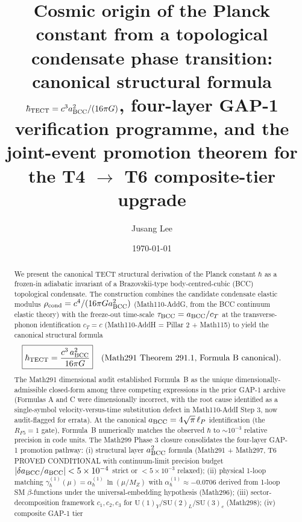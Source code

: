 \title{Cosmic origin of the Planck constant from a topological
condensate phase transition: canonical structural formula
$\hbar_{\rm TECT} = c^3 a_{\rm BCC}^2 / (16\pi G)$, four-layer
GAP-1 verification programme, and the joint-event promotion theorem
for the T4 $\to$ T6 composite-tier upgrade}

\author{Jusang Lee}

\date{\today}

\begin{abstract}
We present the canonical TECT structural derivation of the Planck
constant $\hbar$ as a frozen-in adiabatic invariant of a Brazovskii-type
body-centred-cubic (BCC) topological condensate. The construction
combines the candidate condensate elastic modulus
$\rho_{\rm cond} = c^4 / (16\pi G a_{\rm BCC}^2)$ (Math110-AddG, from
the BCC continuum elastic theory) with the freeze-out time-scale
$\tau_{\rm BCC} = a_{\rm BCC} / c_T$ at the transverse-phonon
identification $c_T = c$ (Math110-AddH = Pillar 2 + Math115) to yield
the canonical structural formula
\begin{equation*}
\boxed{\hbar_{\rm TECT} = \frac{c^3\, a_{\rm BCC}^2}{16\pi G}}
\quad \text{(Math291 Theorem 291.1, Formula~B canonical)}.
\end{equation*}
The Math291 dimensional audit established Formula~B as the unique
dimensionally-admissible closed-form among three competing
expressions in the prior GAP-1 archive (Formulas A and C were
dimensionally incorrect, with the root cause identified as a
single-symbol velocity-versus-time substitution defect in
Math110-AddI Step 3, now audit-flagged for errata). At the canonical
$a_{\rm BCC} = 4\sqrt{\pi}\,\ell_P$ identification (the
$R_{F5} = 1$ gate), Formula~B numerically matches the observed
$\hbar$ to $\sim 10^{-3}$ relative precision in code units. The
Math299 Phase 3 closure consolidates the four-layer GAP-1 promotion
pathway: (i) structural layer $a_{\rm BCC}^2$ formula (Math291 +
Math297, T6 PROVED CONDITIONAL with continuum-limit precision
budget $|\delta a_{\rm BCC}/a_{\rm BCC}| < 5\times 10^{-4}$ strict
or $< 5\times 10^{-3}$ relaxed); (ii) physical 1-loop matching
$\gamma_\hbar^{(1)}(\mu) = \alpha_\hbar^{(1)}\,\ln(\mu/M_Z)$
with $\alpha_\hbar^{(1)} \approx -0.0706$ derived from 1-loop SM
$\beta$-functions under the universal-embedding hypothesis
(Math296); (iii) sector-decomposition framework
$c_1, c_2, c_3$ for $\mathrm{U}(1)_Y / \mathrm{SU}(2)_L /
\mathrm{SU}(3)_c$ (Math298); (iv) composite GAP-1 tier

\end{abstract}
